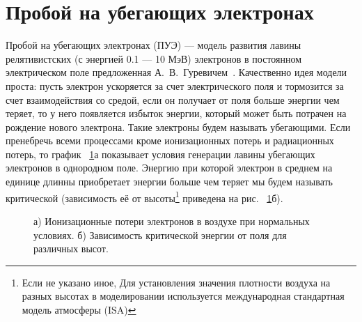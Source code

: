 \section{Пробой на убегающих электронах}\label{sec:thunderstorm/gurevich}
%
Пробой на убегающих электронах (ПУЭ) --- модель развития лавины релятивистских (с энергией 0.1 --- 10 МэВ) электронов в постоянном электрическом поле предложенная А.~В.~Гуревичем~\cite{gurevich1992runaway,Gurevich2001ufn}. Качественно идея модели проста: пусть электрон ускоряется за счет электрического поля и тормозится за счет взаимодействия со средой, если он получает от поля больше энергии чем теряет, то у него появляется избыток энергии, который может быть потрачен на рождение нового электрона. Такие электроны будем называть убегающими. Если пренебречь всеми процессами кроме ионизационных потерь и радиационных потерь, то график ~\ref{fig:storm:gurevich}а показывает условия генерации лавины убегающих электронов в однородном поле. Энергию при которой электрон в среднем на единице длинны приобретает энергии больше чем теряет мы будем называть критической (зависимость её от высоты\footnote{Если не указано иное, Для установления значения плотности воздуха на разных высотах в моделировании используется международная стандартная модель атмосферы (ISA)} приведена на рис. ~\ref{fig:storm:gurevich}б).

\begin{figure}[t]
    \begin{center}
        \begin{minipage}[h]{0.49\linewidth}
        \end{minipage}
        \hfill
        \begin{minipage}[h]{0.49\linewidth}
        \end{minipage}
        \caption{а) Ионизационные потери электронов в воздухе при нормальных условиях. б) Зависимость критической энергии от поля для различных высот.}
    \end{center}
    \label{fig:storm:gurevich}
\end{figure}

